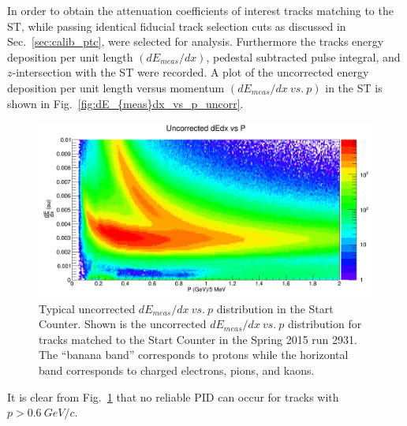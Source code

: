 In order to obtain the attenuation coefficients of interest tracks matching to the ST, while passing identical fiducial track selection cuts as discussed in Sec.~\ref{sec:calib_ptc}, were selected for analysis.  Furthermore the tracks energy deposition per unit length $(dE_{meas} / dx)$, pedestal subtracted pulse integral,  and $z$-intersection with the ST were recorded.  A plot of the uncorrected energy deposition per unit length versus momentum $(dE_{meas} / dx\ vs.\ p)$ in the ST is shown in Fig.~\ref{fig:dE_{meas}dx_vs_p_uncorr}.
	\begin{figure}[!htb]
		\centering
		\includegraphics[width=1.0\columnwidth]{calibration/figs/dEdx_vs_p_uncorr}
		\caption{Typical uncorrected $dE_{meas}/dx\ vs.\ p$ distribution in the Start Counter.  Shown is the uncorrected $dE_{meas}/dx\ vs.\ p$ distribution for tracks matched to the Start Counter in the Spring 2015 run 2931. The ``banana band'' corresponds to protons while the horizontal band corresponds to charged electrons, pions, and kaons.}
		\label{fig:dEdx_vs_p_uncorr}
	\end{figure}
It is clear from Fig.~\ref{fig:dEdx_vs_p_uncorr} that no reliable PID can occur for tracks with $p > 0.6\ GeV/c$.

